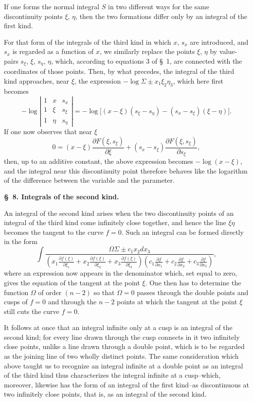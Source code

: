 \documentclass[10pt]{article}
\begin{document}
If one forms the normal integral $S$ in two different ways for the same discontinuity points $\xi$, $\eta$, then the two formations differ only by an integral of the first kind.

For that form of the integrals of the third kind in which $x$, $s_x$ are introduced, and $s_x$ is regarded as a function of $x$, we similarly replace the points $\xi$, $\eta$ by value-pairs $s_\xi$, $\xi$, $s_\eta$, $\eta$, which, according to equations 3 of \S\ 1, are connected with the coordinates of those points. Then, by what precedes, the integral of the third kind approaches, near $\xi$, the expression $-\log\Sigma\pm x_1\xi_2\eta_3$, which here first becomes
\[
-\log\left|
\begin{array}{ccc}
1&x&s_x\\
1&\xi&s_\xi\\
1&\eta&s_\eta
\end{array}
\right|
=-\log\bigl[(x-\xi)(s_\xi-s_\eta)-(s_x-s_\xi)(\xi-\eta)\bigr].
\]
If one now observes that near $\xi$
\[
0=(x-\xi)\frac{\partial F(\xi,s_\xi)}{\partial \xi}+(s_x-s_\xi)\frac{\partial F(\xi,s_\xi)}{\partial s_\xi},
\]
then, up to an additive constant, the above expression becomes $-\log(x-\xi)$, and the integral near this discontinuity point therefore behaves like the logarithm of the difference between the variable and the parameter.

\begin{center}
{\bfseries \S\ 8. Integrals of the second kind.}
\end{center}

An integral of the second kind arises when the two discontinuity points of an integral of the third kind come infinitely close together, and hence the line $\xi\eta$ becomes the tangent to the curve $f=0$. Such an integral can be formed directly in the form
\[
\int
\frac{\Omega\Sigma\pm c_1x_2dx_3}{\left(x_1\frac{\partial f(\xi)}{\partial \xi_1}+x_2\frac{\partial f(\xi)}{\partial \xi_2}+x_3\frac{\partial f(\xi)}{\partial \xi_3}\right)
\left(c_1\frac{\partial f}{\partial x_1}+c_2\frac{\partial f}{\partial x_2}+c_3\frac{\partial f}{\partial x_3}\right)},
\]
where an expression now appears in the denominator which, set equal to zero, gives the equation of the tangent at the point $\xi$. One then has to determine the function $\Omega$ of order $(n-2)$ so that $\Omega=0$ passes through the double points and cusps of $f=0$ and through the $n-2$ points at which the tangent at the point $\xi$ still cuts the curve $f=0$.

It follows at once that an integral infinite only at a cusp is an integral of the second kind; for every line drawn through the cusp connects in it two infinitely close points, unlike a line drawn through a double point, which is to be regarded as the joining line of two wholly distinct points. The same consideration which above taught us to recognize an integral infinite at a double point as an integral of the third kind thus characterizes the integral infinite at a cusp--which, moreover, likewise has the form of an integral of the first kind--as discontinuous at two infinitely close points, that is, as an integral of the second kind.
\end{document}
